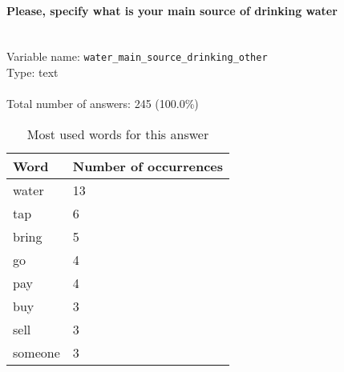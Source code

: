 \documentclass[11.5pt, a4paper]{scrartcl}
\begin{document}
\paragraph{Please, specify what is your main source of drinking water}
\  \\Variable name: \texttt{water\_main\_source\_drinking\_other}\\
Type: text\\
\\Total number of answers: 245 (100.0\%)
\\[0.2em]\begin{table}[H]
 \begin{tabular}{p{4cm}|p{8cm}}
Word & Number of occurrences  \\
\hline
\cellcolor{mygray}water&\cellcolor{mygray}13\\
\hline
tap&6\\
\hline
\cellcolor{mygray}bring&\cellcolor{mygray}5\\
\hline
go&4\\
\hline
\cellcolor{mygray}pay&\cellcolor{mygray}4\\
\hline
buy&3\\
\hline
\cellcolor{mygray}sell&\cellcolor{mygray}3\\
\hline
someone&3\\
\hline
\end{tabular}
\caption{\label{tab:table-name} Most used words for this answer}
\end{table}
\end{document}
